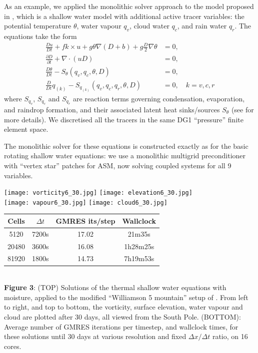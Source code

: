 \documentclass[
]{ImperialPoster}
\newcommand{\pp}[2]{\frac{\partial #1}{\partial #2}}
\newcommand{\DD}[2]{\frac{D #1}{D #2}}
\begin{document}
\begin{multicols}{3}
As an example, we applied the monolithic solver approach
to the model proposed in \cite{zerroukat2015moist}, which is a shallow
water model with additional active tracer variables: the potential
temperature $\theta$, water vapour $q_v$, cloud water $q_c$, and rain
water $q_r$. The equations take the form
\begin{align*}
  \DD{u}{t} + fk\times u + g\theta \nabla (D+b) + g\frac{D}{2}\nabla \theta
  & = 0, \\
  \pp{D}{t} + \nabla\cdot(uD) & = 0, \\
  \DD{\theta}{t} - S_\theta(q_v, q_c, \theta, D) & = 0, \\
  \DD{}{t}q_{(k)} - S_{q_{(k)}}(q_v, q_c, q_r, \theta, D) & = 0, \quad
  k=v,c,r
\end{align*}
where $S_{q_v}$, $S_{q_c}$ and $S_{q_r}$ are reaction terms governing
condensation, evaporation, and raindrop formation, and their associated
latent heat sinks/sources $S_\theta$ (see \cite{zerroukat2015moist}
for more details). We discretised all the tracers in the same DG1
``pressure'' finite element space.

The monolithic solver for these equations is constructed exactly as for
the basic rotating shallow water equations: we use a monolithic multigrid
preconditioner with ``vertex star'' patches for ASM, now solving coupled
systems for all 9 variables. 

\begin{center}
  \texttt{[image: vorticity6\_30.jpg]}
  \texttt{[image: elevation6\_30.jpg]}
  \\
  \texttt{[image: vapour6\_30.jpg]}
  \texttt{[image: cloud6\_30.jpg]}
  \\
  \begin{tabular}{cccc}
    Cells & $\Delta t$ & GMRES its/step & Wallclock \\
    \hline
    5120 & 7200s & 17.02 & 21m35s \\
    20480 & 3600s & 16.08 & 1h28m25s \\
    81920 & 1800s & 14.73 & 7h19m53s \\
  \end{tabular} \\
    \vspace{3mm}
                {\bfseries Figure 3}: (TOP) Solutions of the thermal
                shallow water equations with moisture, applied to the
                modified ``Williamson 5 mountain'' setup of
                \cite{zerroukat2015moist}. From left to right, and top
                to bottom, the vorticity, surface elevation, water vapour
                and cloud are plotted after 30 days, all viewed from the South
                Pole.
                (BOTTOM): Average number of GMRES iterations per timestep,
                and wallclock times, for these solutions until 30
                days at various resolution and fixed $\Delta x/\Delta t$
                ratio, on 16 cores.
  \end{center}


\end{multicols}
\end{document}
